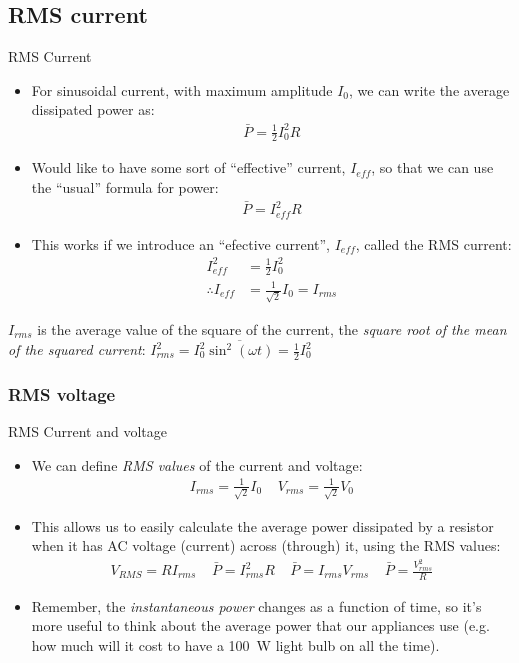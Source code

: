 \documentclass[aspectratio=169,
hyperref={colorlinks,urlcolor=blue}
]{beamer}
\begin{document}
\subsection{RMS current}
\label{subsec:rmscurrent}
\begin{frame}{RMS Current}
\vspace{-0.25cm}
\begin{itemize}
\item  For sinusoidal current, with maximum amplitude $I_0$, we can write the average dissipated power as:
\begin{align*}
\bar P=\frac{1}{2}I^2_0 R
\end{align*}
\item Would like to have some sort of “effective” current, $I_{eff}$, so that we can use the ``usual'' formula for power:
\begin{align*}
\bar P=I^2_{eff}R
\end{align*}
\item This works if we introduce an ``efective current'', $I_{eff}$, called the RMS current:
\begin{align*}
I^2_{eff}&=\frac{1}{2}I^2_0\\
\therefore I_{eff} &= \frac{1}{\sqrt 2} I_0 = I_{rms}
\end{align*}
\end{itemize}
$I_{rms}$ is the average value of the square of the current, the \textit{square root of the mean of the squared current}: 
$I^2_{rms}=I^2_0\overline{\sin^2(\omega t)}=\frac{1}{2}I^2_0$
\end{frame}


\subsubsection{RMS voltage}
\label{subsubsec:rmsvoltage}
\begin{frame}{RMS Current and voltage}
\begin{itemize}
\item We can define \textit{RMS values} of the current and voltage:
\begin{align*}
I_{rms}=\frac{1}{\sqrt 2} I_0 \;\;\;\; V_{rms}=\frac{1}{\sqrt 2} V_0
\end{align*}
\item This allows us to easily calculate the average power dissipated by a resistor when it has AC voltage (current) across (through) it, using the RMS values:
\begin{align*}
V_{RMS}=RI_{rms} \;\;\;\; \bar P=I^2_{rms}R\;\;\;\; \bar P=I_{rms}V_{rms}\;\;\;\; \bar P=\frac{V^2_{rms}}{R}
\end{align*}
\item Remember, the \textit{instantaneous power} changes as a function of time, so it’s more useful to think about the average power that our appliances use (e.g. how much will it cost to have a \SI{100}{W} light bulb on all the time).
\end{itemize}
\end{frame}
\end{document}
